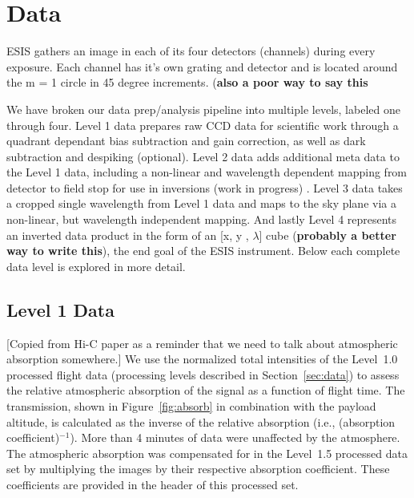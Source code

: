 	
\section{Data}
    ESIS gathers an image in each of its four detectors (channels) during every exposure.  
    Each channel has it's own grating and detector and is located around the m = 1 circle in 45 degree increments. (\textbf{also a poor way to say this}
    
    
    We have broken our data prep/analysis pipeline into multiple levels, labeled one through four.
    Level 1 data prepares raw CCD data for scientific work through a quadrant dependant bias subtraction and gain correction, as well as dark subtraction and despiking (optional).
    Level 2 data adds additional meta data to the Level 1 data, including a non-linear and wavelength dependent mapping from detector to field stop for use in inversions (work in progress)  .
    Level 3 data takes a cropped single wavelength from Level 1 data and maps to the sky plane via a non-linear, but wavelength independent mapping.
    And lastly Level 4 represents an inverted data product in the form of an [x, y , $\lambda$] cube (\textbf{probably a better way to write this}), the end goal of the ESIS instrument.
    Below each complete data level is explored in more detail.
    
    \subsection{Level 1 Data}
    

    
    	[Copied from Hi-C paper as a reminder that we need to talk about atmospheric absorption somewhere.] We use the normalized total intensities of the Level~1.0 processed flight data (processing levels described in Section~\ref{sec:data}) to assess the relative atmospheric absorption of the signal as a function of flight time.  The transmission, shown in Figure~\ref{fig:absorb} in combination with the payload altitude, is calculated as the inverse of the relative absorption (i.e., (absorption coefficient)$^{-1}$). More than 4 minutes of data were unaffected by the atmosphere.  The atmospheric absorption was compensated for in the Level~1.5 processed data set by multiplying the images by their respective absorption coefficient.  These coefficients are provided in the header of this processed set.
    	
